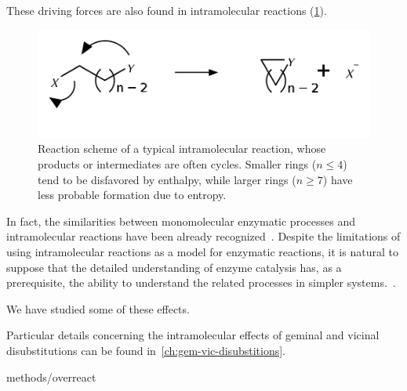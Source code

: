 These driving forces are also found in intramolecular reactions (\cref{fig:reacoes-intramoleculares}).
%
\begin{figure}[hbtp]
	\centering
	\includegraphics[width=.6\textwidth]{figures/reacao-intramolecular}
	\caption[Typical scheme of an intramolecular reactions]{
		Reaction scheme of a typical intramolecular reaction, whose products or
		intermediates are often cycles.
		Smaller rings ($n \le 4 $)
		tend to be disfavored by enthalpy, while larger rings ($n \ge 7 $)
		have less probable formation due to entropy.}%
	\label{fig:reacoes-intramoleculares}
\end{figure}
%
In fact, the similarities between monomolecular enzymatic processes and
intramolecular reactions have been already recognized~\cite{Nilsson_1933,Bruice_1960b,Jung_1990}.
Despite the limitations of using intramolecular reactions as a model for
enzymatic reactions, it is natural to suppose that the detailed understanding
of enzyme catalysis has, as a prerequisite, the ability to understand the
related processes in simpler systems.~\cite{Kirby_1972}.

We have studied some of these effects.

Particular details concerning the intramolecular effects of geminal and
vicinal disubstitutions can be found in~\cref{ch:gem-vic-disubstitions}.

{methods/overreact}
